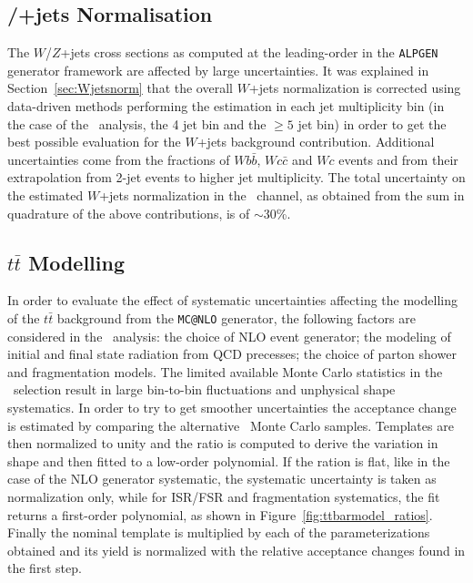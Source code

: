 \subsection{\Wboson/\Zboson+jets Normalisation}
\label{sec:syst_vjetsnormWBX}
The $W$/$Z$+jets cross sections as computed at the
leading-order in the
\texttt{ALPGEN} generator framework
are affected by large uncertainties.
It was explained in Section~\ref{sec:Wjetsnorm}
that the overall $W$+jets normalization is 
corrected using data-driven methods 
performing the estimation in each jet multiplicity
bin (in the case of the \wbx\ analysis, the 4 jet bin
and the $\geq 5$ jet bin) in order to get the best
possible evaluation for the $W$+jets background contribution.
Additional uncertainties come from the fractions of $Wb\bar{b}$, $Wc\bar{c}$ and $Wc$
events and from their extrapolation from 2-jet events to higher jet multiplicity. 
The total uncertainty on the estimated $W$+jets normalization
in the \tight\ channel, as obtained from the  sum in quadrature 
of the above contributions, is of $\sim$30\%.



\subsection{$t\bar{t}$ Modelling}
\label{sec:systematic_ttbarmodel}

In order to evaluate the effect of systematic uncertainties 
affecting the modelling of the $t\bar{t}$ background from the
\texttt{MC@NLO} generator, the following factors are considered
in the \wbx\ analysis: the choice of NLO event generator;
the modeling of initial and final state radiation from QCD
precesses; the choice of parton shower and fragmentation models.
The limited available Monte Carlo statistics in 
the \tight\ selection result in 
large bin-to-bin fluctuations and unphysical shape systematics.
In order to try to get smoother uncertainties 
the acceptance change is estimated by comparing 
the alternative \ttbar\ Monte Carlo samples.
Templates are then normalized to unity and the
ratio is computed to derive the variation in shape
and then fitted to a low-order polynomial.
If the ration is flat, like in the case of
the NLO generator systematic, the systematic uncertainty
is taken as normalization only, while 
for ISR/FSR and fragmentation systematics,
the fit returns a  first-order polynomial, as shown in Figure~\ref{fig:ttbarmodel_ratios}.
Finally the nominal template is multiplied by 
each of the parameterizations obtained and 
its yield is normalized with the relative 
acceptance changes found in the first step.


